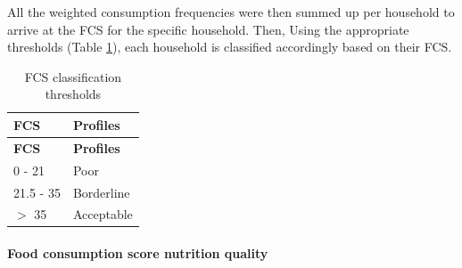 \documentclass[12pt,a4paper]{article}
\let\oldparagraph\paragraph
\renewcommand{\paragraph}[1]{\oldparagraph{#1}\mbox{}}
\begin{document}
All the weighted consumption frequencies were then summed up per household to arrive at the FCS for the specific household. Then, Using the appropriate thresholds (Table \ref{tab:fcsThresholds}), each household is classified accordingly based on their FCS.

\begin{longtable}[]{@{}ll@{}}
\caption{\label{tab:fcsThresholds} FCS classification thresholds}\tabularnewline
\toprule
\begin{minipage}[b]{0.16\columnwidth}\raggedright
\textbf{FCS}\strut
\end{minipage} & \begin{minipage}[b]{0.20\columnwidth}\raggedright
\textbf{Profiles}\strut
\end{minipage}\tabularnewline
\midrule
\endfirsthead
\toprule
\begin{minipage}[b]{0.16\columnwidth}\raggedright
\textbf{FCS}\strut
\end{minipage} & \begin{minipage}[b]{0.20\columnwidth}\raggedright
\textbf{Profiles}\strut
\end{minipage}\tabularnewline
\midrule
\endhead
\begin{minipage}[t]{0.16\columnwidth}\raggedright
0 - 21\strut
\end{minipage} & \begin{minipage}[t]{0.20\columnwidth}\raggedright
Poor\strut
\end{minipage}\tabularnewline
\begin{minipage}[t]{0.16\columnwidth}\raggedright
21.5 - 35\strut
\end{minipage} & \begin{minipage}[t]{0.20\columnwidth}\raggedright
Borderline\strut
\end{minipage}\tabularnewline
\begin{minipage}[t]{0.16\columnwidth}\raggedright
\(>\) 35\strut
\end{minipage} & \begin{minipage}[t]{0.20\columnwidth}\raggedright
Acceptable\strut
\end{minipage}\tabularnewline
\bottomrule
\end{longtable}

\hypertarget{fcsn}{%
\paragraph{Food consumption score nutrition quality}\label{fcsn}}
\end{document}
